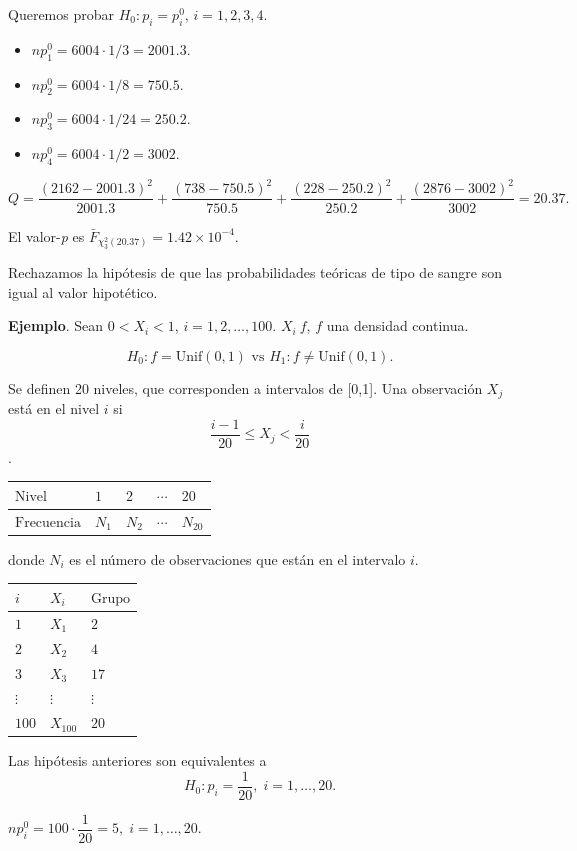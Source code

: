 \documentclass[
  12pt,
]{book}
\begin{document}
Queremos probar \(H_0: p_i = p_i^0\), \(i=1,2,3,4\).

\begin{itemize}
\item
  \(np_1^0 = 6004\cdot1/3 = 2001.3\).
\item
  \(np_2^0 = 6004\cdot1/8 = 750.5\).
\item
  \(np_3^0 = 6004\cdot1/24 = 250.2\).
\item
  \(np_4^0 = 6004\cdot1/2 = 3002\).
\end{itemize}

\[Q = \dfrac{(2162-2001.3)^2}{2001.3} + \dfrac{(738-750.5)^2}{750.5} + \dfrac{(228-250.2)^2}{250.2} + \dfrac{(2876-3002)^2}{3002} = 20.37.\]

El valor-\emph{p} es \(\bar F_{\chi^2_3(20.37)} = 1.42\times 10^{-4}\).

Rechazamos la hipótesis de que las probabilidades teóricas de tipo de sangre son igual al valor hipotético.

\textbf{Ejemplo}. Sean \(0<X_i<1\), \(i=1,2,\dots,100\). \(X_i~f\), \(f\) una densidad continua.

\[H_0: f=\text{Unif}(0,1) \text{ vs } H_1: f \ne\text{Unif}(0,1). \]

Se definen 20 niveles, que corresponden a intervalos de {[}0,1{]}. Una observación \(X_j\) está en el nivel \(i\) si
\[\dfrac{i-1}{20}\leq X_j <\dfrac{i}{20}\].

\begin{longtable}[]{@{}lllll@{}}
\toprule
\(\text{Nivel}\) & \(1\) & \(2\) & \(\cdots\) & \(20\)\tabularnewline
\midrule
\endhead
\(\text{Frecuencia}\) & \(N_1\) & \(N_2\) & \(\cdots\) & \(N_{20}\)\tabularnewline
\bottomrule
\end{longtable}

donde \(N_i\) es el número de observaciones que están en el intervalo \(i\).

\begin{longtable}[]{@{}lll@{}}
\toprule
\(i\) & \(X_i\) & \(\text{Grupo}\)\tabularnewline
\midrule
\endhead
\(1\) & \(X_1\) & \(2\)\tabularnewline
\(2\) & \(X_2\) & \(4\)\tabularnewline
\(3\) & \(X_3\) & \(17\)\tabularnewline
\(\vdots\) & \(\vdots\) & \(\vdots\)\tabularnewline
\(100\) & \(X_{100}\) & \(20\)\tabularnewline
\bottomrule
\end{longtable}

Las hipótesis anteriores son equivalentes a
\[H_0: p_i = \dfrac{1}{20}, \;i=1,\dots,20.\]

\(np_i^0 = 100\cdot\dfrac 1{20} = 5,\;i = 1,\dots,20\).
\end{document}
